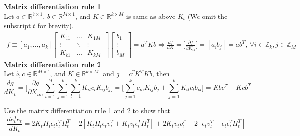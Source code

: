 \documentclass[a4 paper]{article}
\begin{document}
\begin{tcolorbox}[colback=RoyalBlue!5!white,colframe=RoyalBlue!75!black]%
\textbf{Matrix differentiation rule 1}\\
Let $a\in\mathbb{R}^{k\times1}$, $b\in\mathbb{R}^{M\times1}$, and $K\in\mathbb{R}^{k\times M}$ is same as above $K_t$ (We omit the subscript $t$ for brevity).
    \begin{align}
        f\equiv[a_1,...,a_k]\begin{bmatrix}
        K_{11}& \dots & K_{1M}\\
        \vdots& \ddots & \vdots\\
        K_{k1}& \dots & K_{kM}\
        \end{bmatrix}\begin{bmatrix}
        b_1\\\vdots\\b_M
        \end{bmatrix}=a^TKb\Rightarrow\frac{df}{dK}=\Big[\frac{\partial f}{\partial K_{ij}}\Big]=[a_ib_j]=ab^T, \ \forall i\in\mathbb{Z}_{k}, j\in\mathbb{Z}_{M}
    \end{align}
\tcblower
\textbf{Matrix differentiation rule 2}\\
Let $ b,c\in\mathbb{R}^{M\times1}$, and $ K\in\mathbb{R}^{k\times M}$, and $g=c^TK^TKb$, then
\begin{equation}
    \frac{dg}{dK_t}=\Big[\frac{\partial g}{\partial K_{im}}\sum_{i=1}^M\sum_{j=1}^k\sum_{l=1}^k K_{il}c_lK_{ij}b_j\Big]=\Big[\sum_{j=1}^k c_mK_{ij}b_j+\sum_{j=1}^k K_{il}c_lb_m\Big]=Kbc^T+Kcb^T
\end{equation}
\end{tcolorbox}
\begin{tcolorbox}[colback=RubineRed!5!white,colframe=RubineRed!75!black]
\problem{2}{15}
Use the matrix differentiation rule 1 and 2 to show that
\begin{equation}
    \frac{de_t^Te_t}{dK_t}=2K_tH_t\epsilon_t\epsilon_t^TH_t^T -2[K_tH_t\epsilon_{t}v_t^T + K_tv_t\epsilon_t^TH^T_t ] + 2K_tv_tv_t^T + 2[\epsilon_tv^T_t- \epsilon_t\epsilon_t^TH^T_t ]
\end{equation}
\end{tcolorbox}
\end{document}
